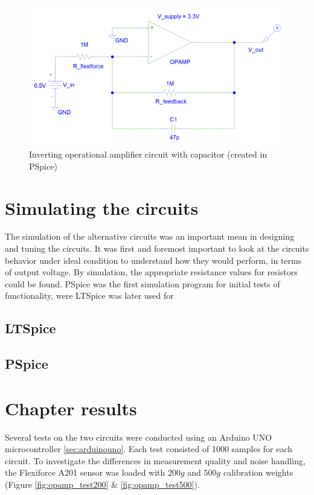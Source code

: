 \begin{figure}
    \centering
    \includegraphics[width=.985\linewidth]{figures/capacitor.png}
    \caption{Inverting operational amplifier circuit with capacitor (created in PSpice)}
    \label{fig:capacitor}
\end{figure}

\section{Simulating the circuits}
\label{sec:simulation}
The simulation of the alternative circuits was an important mean in designing and tuning the circuits. It was first and foremost important to look at the circuits behavior under ideal condition to understand how they would perform, in terms of output voltage. By simulation, the appropriate resistance values for resistors could be found. PSpice was the first simulation program for initial tests of functionality, were LTSpice was later used for 
\subsection{LTSpice}
\label{subsec:ltspice}

\subsection{PSpice}
\label{subsec:pspice}


\section{Chapter results}
\label{sec:circuitresults}

Several tests on the two circuits were conducted using an Arduino UNO microcontroller \ref{sec:arduinouno}. Each test consisted of 1000 samples for each circuit. To investigate the differences in measurement quality and noise handling, the Flexiforce A201 sensor was loaded with $200g$ and $500g$ calibration weights (Figure \ref{fig:opamp_test200} \& \ref{fig:opamp_test500}).


